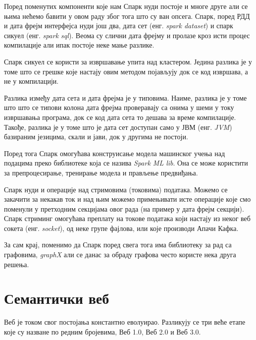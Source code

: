 \documentclass[12pt,oneside]{memoir}
\begin{document}
Поред поменутих компоненти које нам Спарк нуди постоје и многе друге али се њима нећемо бавити у овом раду због тога што су ван опсега. Спарк, поред РДД и дата фрејм интерфејса нуди још два, дата сет (енг. \textit{spark dataset}) и спарк сикуел (енг. \textit{spark sql}). Веома су слични дата фрејму и пролазе кроз исти процес компилације али ипак постоје неке мање разлике. \cite{spark_guide} 

Спарк сикуел се користи за извршавање упита над кластером. Једина разлика је у томе што се грешке које настају овим методом појављују док се код извршава, а не у компилацији. \cite{spark_guide}

Разлика између дата сета и дата фрејма је у типовима. Наиме, разлика је у томе што што се типови колона дата фрејма проверавају са онима у шеми у току извршавања програма, док се код дата сета то дешава за време компилације. Такође, разлика је у томе што је дата сет доступан само у ЈВМ (енг. \textit{JVM}) базираним језицима, скали и јави, док у другима не постоји. \cite{spark_guide}

Поред тога Спарк омогућава конструисање модела машинског учења над подацима преко библиотеке која се назива \textit{Spark ML lib}. Она се може користити за препроцесирање, тренирање модела и прављење предвиђања. \cite{spark_guide}

Спарк нуди и операције над стримовима (токовима) података. Можемо се закачити за некакав ток и над њим можемо примењивати исте операције које смо поменули у претходним секцијама овог рада (на пример у дата фрејм секцији). Спарк стриминг омогућава преплату на токове података који настају из неког веб сокета (енг. \textit{socket}), од неке групе фајлова, или које производи Апачи Кафка. \cite{spark_streaming}

За сам крај, поменимо да Спарк поред свега тога има библиотеку за рад са графовима, \textit{graphX} али се данас за обраду графова често користе нека друга решења. \cite{spark_guide}


\chapter{Семантички веб}
\label{chp:sem_veb}

Веб је током свог постојања константно еволуирао. Разликују се три веће етапе које су назване по редним бројевима, Веб 1.0, Веб 2.0 и Веб 3.0.
\end{document}
